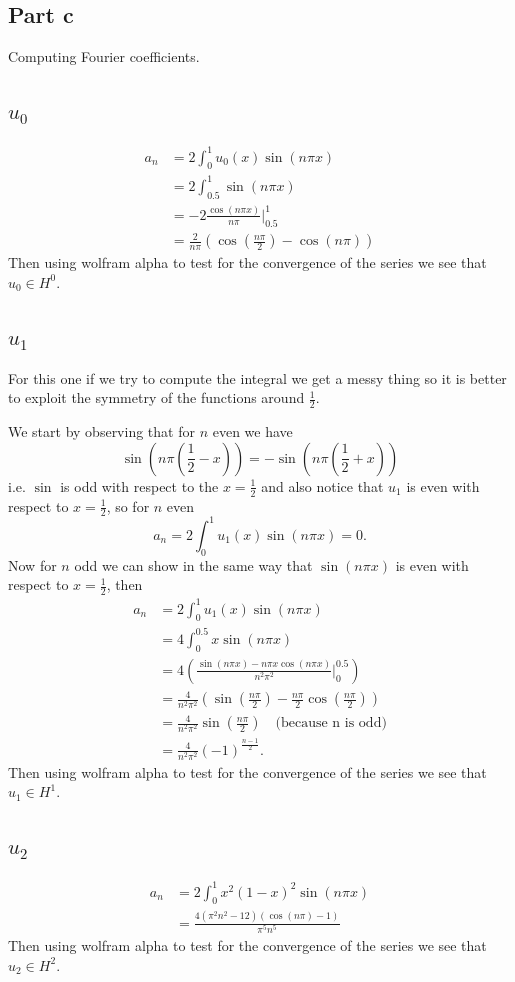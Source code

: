 \documentclass{article}
\begin{document}
\subsection{Part c}
Computing Fourier coefficients.
\subsection{$u_0$}
\begin{align*}
	a_n&=2\int_0^1 u_0(x)\sin(n\pi x)\\
	  &=2\int_{0.5}^1\sin(n\pi x)\\
	  &= -2\frac{\cos(n\pi x)}{n\pi}\Big|_{0.5}^1\\
	  &= \frac{2}{n\pi}\left(\cos\left(\frac{n\pi}{2}\right)-\cos(n\pi)\right)
\end{align*}
Then using wolfram alpha to test for the convergence of the series we see that
$u_0\in H^0$.
\subsection{$u_1$}
For this one if we try to compute the integral we get a messy thing so it is
better to exploit the symmetry of the functions around $\frac{1}{2}$.

We start by observing that for $n$ even we have
\[
\sin\left(n\pi \left(\frac{1}{2}-x\right)\right)=-\sin\left(n\pi \left(\frac{1}{2}+x\right)\right)
\]
i.e. $\sin$ is odd with respect to the
$x=\frac{1}{2}$ and also notice that $u_1$ is even with respect to
$x=\frac{1}{2}$, so for $n$ even
\[
a_n=2\int_0^1 u_1(x)\sin(n\pi x)=0.
\]
Now for $n$ odd we can show in the same way that $\sin(n\pi x)$ is even with
respect to $x=\frac{1}{2}$, then
\begin{align*}
	a_n&=2\int_0^1 u_1(x)\sin(n\pi x)\\
	  &=4\int_0^{0.5}x\sin(n\pi x)\\
	  &=4\left(\frac{\sin(n\pi x)-n\pi x\cos(n\pi x)}{n^2\pi^2}\Big|_0^{0.5}\right)\\
	  &=\frac{4}{n^2\pi^2}\left(\sin\left(\frac{n\pi}{2}\right)-\frac{n\pi}{2}\cos\left(\frac{n\pi}{2}\right)\right)\\
	  &=\frac{4}{n^2\pi^2}\sin\left(\frac{n\pi}{2}\right) \quad \text{(because n is odd)}\\
	  &=\frac{4}{n^2\pi^2}(-1)^{\frac{n-1}{2}}.
\end{align*}
Then using wolfram alpha to test for the convergence of the series we see that
$u_1\in H^1$.
\subsection{$u_2$}
\begin{align*}
	a_n&=2\int_0^1 x^2(1-x)^2\sin(n\pi x)\\
	   &=\frac{4(\pi^2 n^2-12)(\cos(n\pi)-1)}{\pi^5n^5}
\end{align*}
Then using wolfram alpha to test for the convergence of the series we see that
$u_2\in H^2$.
\end{document}

